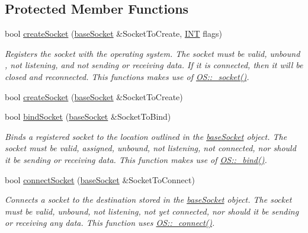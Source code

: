 \subsection*{Protected Member Functions}
\begin{DoxyCompactItemize}
\item 
bool \hyperlink{class_communication_1_1base_gateway_a47e8f182fca56a7658f94e8b173d63f2}{create\+Socket} (\hyperlink{class_communication_1_1base_socket}{base\+Socket} \&Socket\+To\+Create, \hyperlink{typedefs_8h_a0240b856f74f8905ed334a5a0ca624e5}{I\+N\+T} flags)
\begin{DoxyCompactList}\small\item\em Registers the socket with the operating system. The socket must be valid, unbound , not listening, and not sending or receiving data. If it is connected, then it will be closed and reconnected. This functions makes use of \hyperlink{class_communication_1_1_o_s_ab3ce5ee10f85abdf1c3d258132d12b78}{O\+S\+::\+\_\+socket()}. \end{DoxyCompactList}\item 
bool \hyperlink{class_communication_1_1base_gateway_a650a204d981cd4a89cf2115ca195d844}{create\+Socket} (\hyperlink{class_communication_1_1base_socket}{base\+Socket} \&Socket\+To\+Create)
\item 
bool \hyperlink{class_communication_1_1base_gateway_adf19a1e4e5cf90f3e4e97edb9a791e0b}{bind\+Socket} (\hyperlink{class_communication_1_1base_socket}{base\+Socket} \&Socket\+To\+Bind)
\begin{DoxyCompactList}\small\item\em Binds a registered socket to the location outlined in the \hyperlink{class_communication_1_1base_socket}{base\+Socket} object. The socket must be valid, assigned, unbound, not listening, not connected, nor should it be sending or receiving data. This function makes use of \hyperlink{class_communication_1_1_o_s_a7815dee0292a83340b8b4a4a16906aad}{O\+S\+::\+\_\+bind()}. \end{DoxyCompactList}\item 
bool \hyperlink{class_communication_1_1base_gateway_a3118d268cf632aefe2ce05daa71bcc86}{connect\+Socket} (\hyperlink{class_communication_1_1base_socket}{base\+Socket} \&Socket\+To\+Connect)
\begin{DoxyCompactList}\small\item\em Connects a socket to the destination stored in the \hyperlink{class_communication_1_1base_socket}{base\+Socket} object. The socket must be valid, unbound, not listening, not yet connected, nor should it be sending or receiving any data. This function uses \hyperlink{class_communication_1_1_o_s_a927b094016b9c8b5dec6756ab958bea0}{O\+S\+::\+\_\+connect()}. \end{DoxyCompactList}\item 

\end{DoxyCompactItemize}
